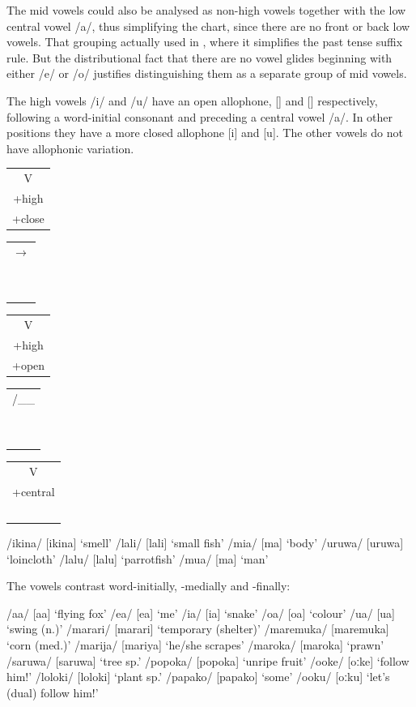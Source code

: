 The mid vowels could also be analysed as non-high vowels together with the low central vowel /a/, thus simplifying the chart, since there are no front or back low vowels. That grouping  actually used in , where it simplifies the past tense suffix rule. But the distributional fact that there are no vowel glides beginning with either /e/ or /o/ justifies distinguishing them as a separate group of mid vowels.  

The high vowels /i/ and /u/ have an open allophone, [{\textsci}] and [{\textupsilon}] respectively, following a word-initial consonant and preceding a central vowel /a/. In other positions they have a more closed allophone [i] and [u]. The other vowels do not have allophonic variation.

\ea
\begin{tabular}{c}V\\+high\\+close\end{tabular}
\begin{tabular}{c}$\to$\\~\\~\end{tabular}
\begin{tabular}{c}V\\+high\\+open\end{tabular}
\begin{tabular}{c}/\_\_\\~\\~\end{tabular}
\begin{tabular}{c}V\\+central\\~\end{tabular}
\z

\ea
\ea
/ikina/  [i{{\textprimstress}kina}]  `smell'
\ex
/lali/  [la{{\textprimstress}li}]  `small fish'
\ex
/mia/  [m{\textsci{{\textprimstress}}}a]  `body'
\ex
/uruwa/  [u{{\textprimstress}ruwa}]  `loincloth'
\ex
/lalu/  [la{{\textprimstress}lu}]  `parrotfish'
\ex
/mua/  [m{\textupsilon{{\textprimstress}}}a]  `man'
\z
\z

The vowels contrast word-initially, -medially and -finally:

\ea
\ea
/a{\textphi}a/  [a{{\textprimstress}}{\textphi}a]  `flying fox'
\ex
/e{\textphi}a/  [e{{\textprimstress}}{\textphi}a]  `me'
\ex
/i{\textphi}a/  [i{{\textprimstress}}{\textphi}a]  `snake'
\ex
/o{\textphi}a/  [o{{\textprimstress}}{\textphi}a]  `colour'
\ex
/u{\textphi}a/  [u{{\textprimstress}}{\textphi}a]  `swing (n.)'
\ex
/marari/  [ma{{\textprimstress}rari}]  `temporary (shelter)'
\ex
/maremuka/  [ma{{\textprimstress}remuka}]  `corn (med.)'
\ex
/marija/  [ma{{\textprimstress}riya}]  `he/she scrapes'
\ex
/maroka/  [ma{{\textprimstress}roka}]  `prawn'
\ex
/saruwa/  [sa{{\textprimstress}ruwa}]  `tree sp.'
\ex
/popoka/  [po{{\textprimstress}poka}]  `unripe fruit'
\ex
/ooke/  [{{\textprimstress}oːke}]  `follow him!'
\ex
/loloki/  [lo{{\textprimstress}loki}]  `plant sp.'
\ex
/papako/  [pa{{\textprimstress}pako}]  `some'
\ex
/ooku/  [{{\textprimstress}oːku}]  `let's (dual) follow him!'
\z
\z


